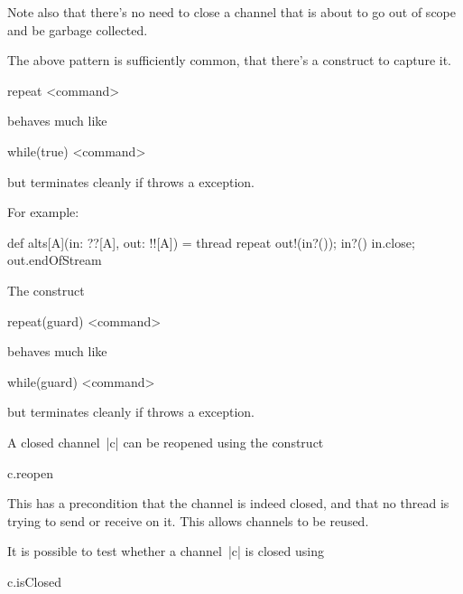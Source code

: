 Note also that there's no need to close a channel that is about to go out of
scope and be garbage collected. 

The above pattern is sufficiently common, that there's a construct to capture
it.
%
\begin{scala}
  repeat{ <command> }
\end{scala}
%
behaves much like
\begin{scala}
  while(true){ <command> }
\end{scala}
but terminates cleanly if  throws a 
exception.

For example:
%
\begin{scala}
def alts[A](in: ??[A], out: !![A]) = thread{ 
  repeat{ out!(in?()); in?() } 
  in.close; out.endOfStream
}
\end{scala}


The construct
%
\begin{scala}
  repeat(guard){ <command> }
\end{scala}
%
behaves much like
\begin{scala}
  while(guard){ <command> }
\end{scala}
but terminates cleanly if  throws a 
exception.

A closed channel~|c| can be reopened using the construct
\begin{scala}
  c.reopen
\end{scala}
%
This has a precondition that the channel is indeed closed, and that no thread
is trying to send or receive on it.  This allows channels to be reused.

It is possible to test whether a channel~|c| is closed using
%
\begin{scala}
  c.isClosed
\end{scala}
